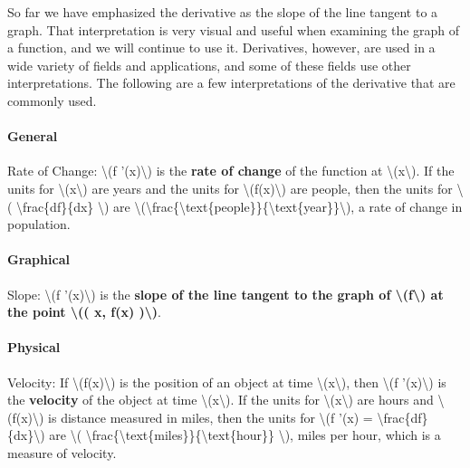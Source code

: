 So far we have emphasized the derivative as the slope of the line
tangent to a graph. That interpretation is very visual and useful when
examining the graph of a function, and we will continue to use it.
Derivatives, however, are used in a wide variety of fields and
applications, and some of these fields use other interpretations. The
following are a few interpretations of the derivative that are commonly
used.

\hypertarget{general}{%
\paragraph{General}\label{general}}

Rate of Change: \textbackslash{}(f '(x)\textbackslash{}) is the
\textbf{rate of change} of the function at
\textbackslash{}(x\textbackslash{}). If the units for
\textbackslash{}(x\textbackslash{}) are years and the units for
\textbackslash{}(f(x)\textbackslash{}) are people, then the units for
\textbackslash{}( \textbackslash{}frac\{df\}\{dx\} \textbackslash{}) are
\textbackslash{}(\textbackslash{}frac\{\textbackslash{}text\{people\}\}\{\textbackslash{}text\{year\}\}\textbackslash{}),
a rate of change in population.

\hypertarget{graphical}{%
\paragraph{Graphical}\label{graphical}}

Slope: \textbackslash{}(f '(x)\textbackslash{}) is the \textbf{slope of
the line tangent to the graph of \textbackslash{}(f\textbackslash{}) at
the point \textbackslash{}(( x, f(x) )\textbackslash{})}.

\hypertarget{physical}{%
\paragraph{Physical}\label{physical}}

Velocity: If \textbackslash{}(f(x)\textbackslash{}) is the position of
an object at time \textbackslash{}(x\textbackslash{}), then
\textbackslash{}(f '(x)\textbackslash{}) is the \textbf{velocity} of the
object at time \textbackslash{}(x\textbackslash{}). If the units for
\textbackslash{}(x\textbackslash{}) are hours and
\textbackslash{}(f(x)\textbackslash{}) is distance measured in miles,
then the units for \textbackslash{}(f '(x) =
\textbackslash{}frac\{df\}\{dx\}\textbackslash{}) are \textbackslash{}(
\textbackslash{}frac\{\textbackslash{}text\{miles\}\}\{\textbackslash{}text\{hour\}\}
\textbackslash{}), miles per hour, which is a measure of velocity.

